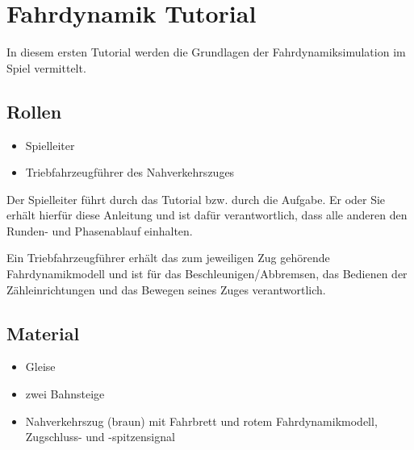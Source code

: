 

\section{Fahrdynamik Tutorial}

In diesem ersten Tutorial werden die Grundlagen der Fahrdynamiksimulation im Spiel vermittelt.

\subsection*{Rollen}

  \begin{itemize}
    \item Spielleiter
    \item Triebfahrzeugführer des Nahverkehrszuges
  \end{itemize}

  Der Spielleiter führt durch das Tutorial bzw. durch die Aufgabe. Er oder Sie erhält hierfür diese Anleitung und ist dafür verantwortlich, dass alle anderen den Runden- und Phasenablauf einhalten.

  Ein Triebfahrzeugführer erhält das zum jeweiligen Zug gehörende Fahrdynamikmodell und ist für das Beschleunigen/Abbremsen, das Bedienen der Zähleinrichtungen und das Bewegen seines Zuges verantwortlich.

\subsection*{Material}

  \begin{itemize}
    \item Gleise
    \item zwei Bahnsteige
    \item Nahverkehrszug (braun) mit Fahrbrett und rotem Fahrdynamikmodell, Zugschluss- und -spitzensignal
  \end{itemize}

